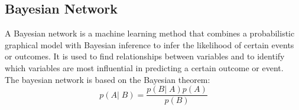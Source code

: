 \subsection{Bayesian Network}
A Bayesian network is a machine learning method that combines a probabilistic graphical model with Bayesian inference to infer the likelihood of certain events or outcomes. It is used to find relationships between variables and to identify which variables are most influential in predicting a certain outcome or event. \\
The bayesian network is based on the Bayesian theorem:
\begin{equation*}
    p(A|\;B) = \frac{p(B|\;A)p(A)}{p(B)}
\end{equation*}

